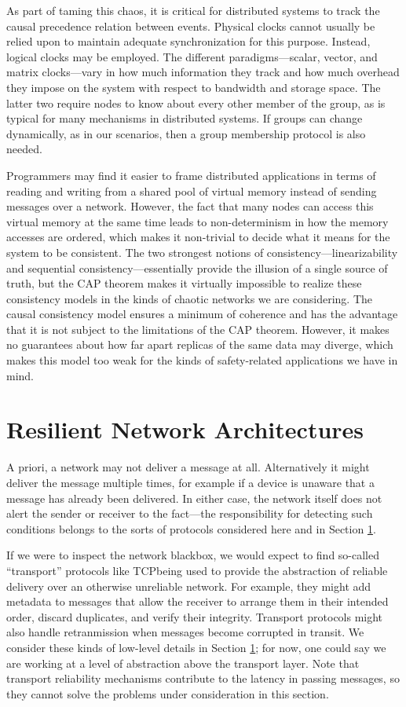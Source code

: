 \documentclass[]             %
{NASA}                       %
\theoremstyle{definition}
\begin{document}
As part of taming this chaos, it is critical for distributed systems
to track the causal precedence relation between events. Physical
clocks cannot usually be relied upon to maintain adequate
synchronization for this purpose. Instead, logical clocks may be
employed. The different paradigms---scalar, vector, and matrix
clocks---vary in how much information they track and how much overhead
they impose on the system with respect to bandwidth and storage
space. The latter two require nodes to know about every other member
of the group, as is typical for many mechanisms in distributed
systems. If groups can change dynamically, as in our scenarios, then a
group membership protocol is also needed.

Programmers may find it easier to frame distributed applications in
terms of reading and writing from a shared pool of virtual memory
instead of sending messages over a network. However, the fact that
many nodes can access this virtual memory at the same time leads to
non-determinism in how the memory accesses are ordered, which makes it
non-trivial to decide what it means for the system to be
consistent. The two strongest notions of consistency---linearizability
and sequential consistency---essentially provide the illusion of a
single source of truth, but the CAP theorem makes it virtually
impossible to realize these consistency models in the kinds of chaotic
networks we are considering. The causal consistency model ensures a
minimum of coherence and has the advantage that it is not subject to
the limitations of the CAP theorem. However, it makes no guarantees
about how far apart replicas of the same data may diverge, which makes
this model too weak for the kinds of safety-related applications we
have in mind.

\section{Resilient Network Architectures}
\label{sec:networking}

A priori, a network may not deliver a message at all. Alternatively it
might deliver the message multiple times, for example if a device is
unaware that a message has already been delivered. In either case, the
network itself does not alert the sender or receiver to the fact---the
responsibility for detecting such conditions belongs to the sorts of
protocols considered here and in Section \ref{sec:networking}.

If we were to inspect the network blackbox, we would expect to find
so-called ``transport'' protocols like TCP\citationneeded being used
to provide the abstraction of reliable delivery over an otherwise
unreliable network. For example, they might add metadata to messages
that allow the receiver to arrange them in their intended order,
discard duplicates, and verify their integrity. Transport protocols
might also handle retranmission when messages become corrupted in
transit. We consider these kinds of low-level details in Section
\ref{sec:networking}; for now, one could say we are working at a level
of abstraction above the transport layer. Note that transport
reliability mechanisms contribute to the latency in passing messages,
so they cannot solve the problems under consideration in this section.
\end{document}
